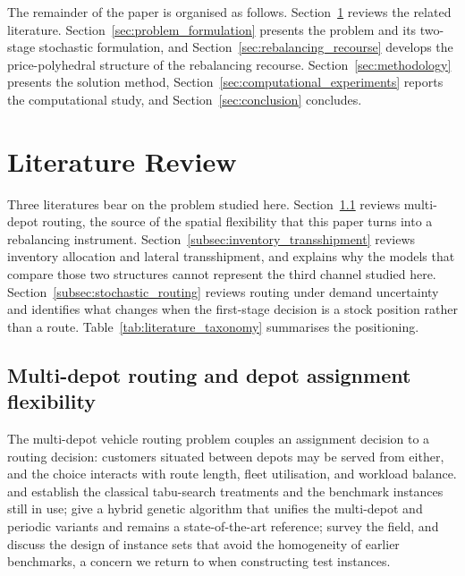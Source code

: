 \documentclass[authoryear,final,3p,times]{elsarticle}
\theoremstyle{definition}
\theoremstyle{plain}
\begin{document}
The remainder of the paper is organised as follows.
Section~\ref{sec:literature_review} reviews the related literature.
Section~\ref{sec:problem_formulation} presents the problem and its two-stage
stochastic formulation, and Section~\ref{sec:rebalancing_recourse} develops the
price-polyhedral structure of the rebalancing recourse.
Section~\ref{sec:methodology} presents the solution method,
Section~\ref{sec:computational_experiments} reports the computational study,
and Section~\ref{sec:conclusion} concludes.

\section{Literature Review}
\label{sec:literature_review}

Three literatures bear on the problem studied here.
Section~\ref{subsec:multidepot} reviews multi-depot routing, the source of the
spatial flexibility that this paper turns into a rebalancing instrument.
Section~\ref{subsec:inventory_transshipment} reviews inventory allocation and
lateral transshipment, and explains why the models that compare those two
structures cannot represent the third channel studied here.
Section~\ref{subsec:stochastic_routing} reviews routing under demand
uncertainty and identifies what changes when the first-stage decision is a
stock position rather than a route.  Table~\ref{tab:literature_taxonomy}
summarises the positioning.

\subsection{Multi-depot routing and depot assignment flexibility}
\label{subsec:multidepot}

The multi-depot vehicle routing problem couples an assignment decision to a
routing decision: customers situated between depots may be served from
either, and the choice interacts with route length, fleet utilisation, and
workload balance. \citet{renaud1996tabu} and \citet{cordeau1997vrp} establish
the classical tabu-search treatments and the benchmark instances still in
use; \citet{vidal2012hybrid} give a hybrid genetic algorithm that unifies the
multi-depot and periodic variants and remains a state-of-the-art reference;
\citet{montoyatorres2015literature} survey the field, and
\citet{uchoa2017benchmark} discuss the design of instance sets that avoid the
homogeneity of earlier benchmarks, a concern we return to when constructing
test instances.
\end{document}
